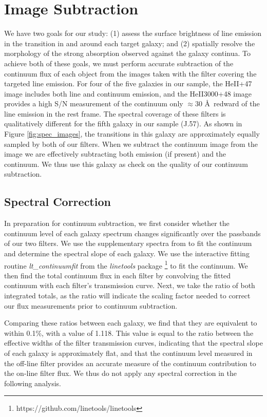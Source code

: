 \documentclass[trackchanges,twocolumn]{aastex62}
\begin{document}
\section{Image Subtraction}\label{sec.cont_sub}
We have two goals for our study: (1) assess the surface brightness of line emission in the  transition in and around each target galaxy; and (2) spatially resolve the morphology of the strong  absorption observed against the galaxy continua.
To achieve both of these goals, we must perform accurate subtraction of the continuum flux of each object from the images taken with the filter covering the targeted line emission. For four of the five galaxies in our sample, the HeII+47 image includes both line and continuum emission, and the HeII3000+48 image provides a high S/N measurement of the continuum only $\approx30$ \AA\ redward of the line emission in the rest frame. %
The spectral coverage of these filters is qualitatively different for the fifth galaxy in our sample (J.57).
As shown in Figure \ref{fig:spec_images}, the  transitions in this galaxy are approximately equally sampled by both of our filters. When we subtract the continuum image from the  image we are effectively subtracting both  emission (if present) and the continuum. We thus use this galaxy as check on the quality of our continuum subtraction.

\subsection{Spectral Correction}
In preparation for continuum subtraction, we first consider whether the continuum level of each galaxy spectrum changes significantly over the passbands of our two filters.
We use the supplementary spectra from \citet{Rubin_2014} to fit the continuum and determine the spectral slope of each galaxy. We use the interactive fitting routine \emph{lt\_continuumfit} from the \emph{linetools} package \citep{Prochaska2016}\footnote{https://github.com/linetools/linetools} to fit the continuum. We then find the total continuum flux in each filter by convolving the fitted continuum with each filter's transmission curve. Next, we take the ratio of both integrated totals, as the ratio will indicate the scaling factor needed to correct our flux measurements prior to continuum subtraction. 

Comparing these ratios between each galaxy, we find that they are equivalent to within 0.1\%, with a value of 1.118. This value is equal to the ratio between the effective widths of the filter transmission curves, indicating that the spectral slope of each galaxy is approximately flat, and that the continuum level measured in the off-line filter provides an accurate measure of the continuum contribution to the on-line filter flux.  We thus do not apply any spectral correction in the following analysis.
\end{document}

